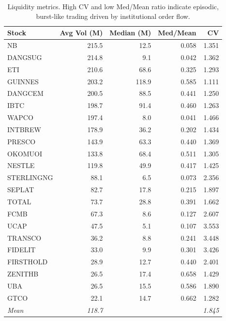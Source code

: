 \documentclass[twoside,11pt]{article}
\begin{document}
	\begin{table}[ht]
		\centering
		\caption{Liquidity metrics. High CV and low Med/Mean ratio indicate episodic, burst-like trading driven by
		institutional order flow.}
		\label{tab:liquidity}
		\small
		\begin{tabular}{lrrrr}
			\toprule
			\textbf{Stock} & \textbf{Avg Vol (M)} & \textbf{Median (M)} &
			\textbf{Med/Mean} & \textbf{CV}\\
			\midrule
			NB         & 215.5 &  12.5 & 0.058 & 1.351\\
			DANGSUG    & 214.8 &   9.1 & 0.042 & 1.362\\
			ETI        & 210.6 &  68.6 & 0.325 & 1.293\\
			GUINNES    & 203.2 & 118.9 & 0.585 & 1.111\\
			DANGCEM    & 200.5 &  88.5 & 0.441 & 1.250\\
			IBTC       & 198.7 &  91.4 & 0.460 & 1.263\\
			WAPCO      & 197.4 &   8.0 & 0.041 & 1.466\\
			INTBREW    & 178.9 &  36.2 & 0.202 & 1.434\\
			PRESCO     & 143.9 &  63.3 & 0.440 & 1.369\\
			OKOMUOI    & 133.8 &  68.4 & 0.511 & 1.305\\
			NESTLE     & 119.8 &  49.9 & 0.417 & 1.425\\
			STERLINGNG &  88.1 &   6.5 & 0.073 & 2.356\\
			SEPLAT     &  82.7 &  17.8 & 0.215 & 1.897\\
			TOTAL      &  73.7 &  28.8 & 0.391 & 1.662\\
			FCMB       &  67.3 &   8.6 & 0.127 & 2.607\\
			UCAP       &  47.5 &   5.1 & 0.107 & 3.553\\
			TRANSCO    &  36.2 &   8.8 & 0.241 & 3.448\\
			FIDELIT    &  33.0 &   9.9 & 0.301 & 3.426\\
			FIRSTHOLD  &  28.9 &  12.7 & 0.440 & 2.401\\
			ZENITHB    &  26.5 &  17.4 & 0.658 & 1.429\\
			UBA        &  26.5 &  15.5 & 0.586 & 1.890\\
			GTCO       &  22.1 &  14.7 & 0.662 & 1.282\\
			\midrule
			\textit{Mean} & \textit{118.7} & & & \textit{1.845}\\
			\bottomrule
		\end{tabular}
	\end{table}
	
\end{document}

